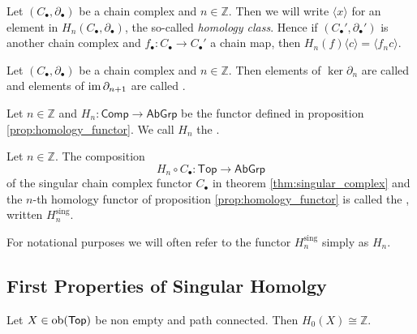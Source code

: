 \begin{remark}
	Let $(C_\bullet,\partial_\bullet)$ be a chain complex and $n \in \mathbb{Z}$. Then we will write $\langle x \rangle$ for an element in $H_n(C_\bullet,\partial_\bullet)$, the so-called \emph{homology class}. Hence if $(C_\bullet',\partial_\bullet')$ is another chain complex and $f_\bullet : C_\bullet \to C_\bullet'$ a chain map, then $H_n(f)\langle c \rangle = \langle f_nc\rangle$. 
\end{remark}

\begin{definition}
	Let $(C_\bullet,\partial_\bullet)$ be a chain complex and $n \in \mathbb{Z}$. Then elements of $\ker \partial_n$ are called  and elements of $\operatorname{im} \partial_{n + 1}$ are called .
\end{definition}

\begin{definition}
	Let $n \in \mathbb{Z}$ and $H_n : \mathsf{Comp} \to \mathsf{AbGrp}$ be the functor defined in proposition \ref{prop:homology_functor}. We call $H_n$ the .
\end{definition}

\begin{definition}
	Let $n \in \mathbb{Z}$. The composition 
	\begin{equation}
		H_n \circ C_\bullet : \mathsf{Top} \to \mathsf{AbGrp}
	\end{equation}
	\noindent of the singular chain complex functor $C_\bullet$ in theorem \ref{thm:singular_complex} and the $n$-th homology functor of proposition \ref{prop:homology_functor} is called the , written $H^{\mathrm{sing}}_n$.
\end{definition}

\begin{remark}
	For notational purposes we will often refer to the functor $H_n^{\mathrm{sing}}$ simply as $H_n$.
\end{remark}

\subsection*{First Properties of Singular Homolgy}

\begin{proposition}
	Let $X \in \operatorname{ob}(\mathsf{Top})$ be non empty and path connected. Then $H_0(X) \cong \mathbb{Z}$.
\end{proposition}


